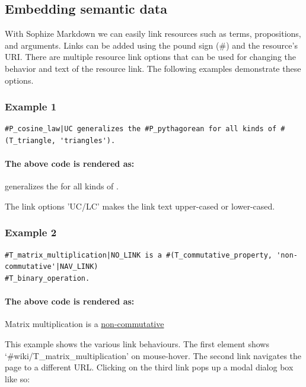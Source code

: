 \documentclass[a4paper]{article}
\begin{document}
\subsection{Embedding semantic data}

With Sophize Markdown we can easily link resources such as terms, propositions, and arguments. Links can be added using the pound sign (\#) and the resource's URI. There are multiple resource link options that can be used for changing the behavior and text of the resource link. The following examples demonstrate these options.

\subsubsection*{Example 1}
\begin{verbatim}
#P_cosine_law|UC generalizes the #P_pythagorean for all kinds of #(T_triangle, 'triangles').
\end{verbatim}

\paragraph{The above code is rendered as:}
\begin{mdframed}
 generalizes the  for all kinds of .
\end{mdframed}

The link options 'UC/LC' makes the link text upper-cased or lower-cased.

\subsubsection*{Example 2}
\begin{verbatim}
#T_matrix_multiplication|NO_LINK is a #(T_commutative_property, 'non-commutative'|NAV_LINK)
#T_binary_operation.
\end{verbatim}

\paragraph{The above code is rendered as:}
\begin{mdframed}
Matrix multiplication is a \underline{non-commutative} 
\end{mdframed}
This example shows the various link behaviours. The first element shows `\#wiki/T\_matrix\_multiplication' on mouse-hover. The second link navigates the page to a different URL. Clicking on the third link pops up a modal dialog box like so:
\end{document}
